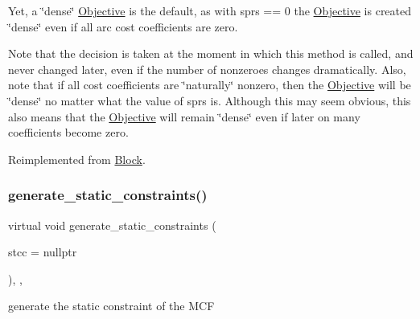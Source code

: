 Yet, a \char`\"{}dense\char`\"{} \mbox{\hyperlink{class_s_m_spp__di__unipi__it_1_1_objective}{Objective}} is the default, as with sprs == 0 the \mbox{\hyperlink{class_s_m_spp__di__unipi__it_1_1_objective}{Objective}} is created \char`\"{}dense\char`\"{} even if all arc cost coefficients are zero.

Note that the decision is taken at the moment in which this method is called, and never changed later, even if the number of nonzeroes changes dramatically. Also, note that if all cost coefficients are \char`\"{}naturally\char`\"{} nonzero, then the \mbox{\hyperlink{class_s_m_spp__di__unipi__it_1_1_objective}{Objective}} will be \char`\"{}dense\char`\"{} no matter what the value of sprs is. Although this may seem obvious, this also means that the \mbox{\hyperlink{class_s_m_spp__di__unipi__it_1_1_objective}{Objective}} will remain \char`\"{}dense\char`\"{} even if later on many coefficients become zero. 

Reimplemented from \mbox{\hyperlink{class_s_m_spp__di__unipi__it_1_1_block_ae14038d64cf6067f15cf3f53fd7af9e0}{Block}}.

\mbox{\label{class_s_m_spp__di__unipi__it_1_1_m_c_f_block_a33f94035590874ef8616982e11e7bb43}} 
\subsubsection{\texorpdfstring{generate\+\_\+static\+\_\+constraints()}{generate\_static\_constraints()}}
{\footnotesize\ttfamily virtual void generate\+\_\+static\+\_\+constraints (\begin{DoxyParamCaption}\item[{\mbox{\hyperlink{class_s_m_spp__di__unipi__it_1_1_configuration}{Configuration}} $\ast$}]{stcc = {\ttfamily nullptr} }\end{DoxyParamCaption})\hspace{0.3cm}{\ttfamily [final]}, {\ttfamily [override]}, {\ttfamily [virtual]}}



generate the static constraint of the M\+CF 

